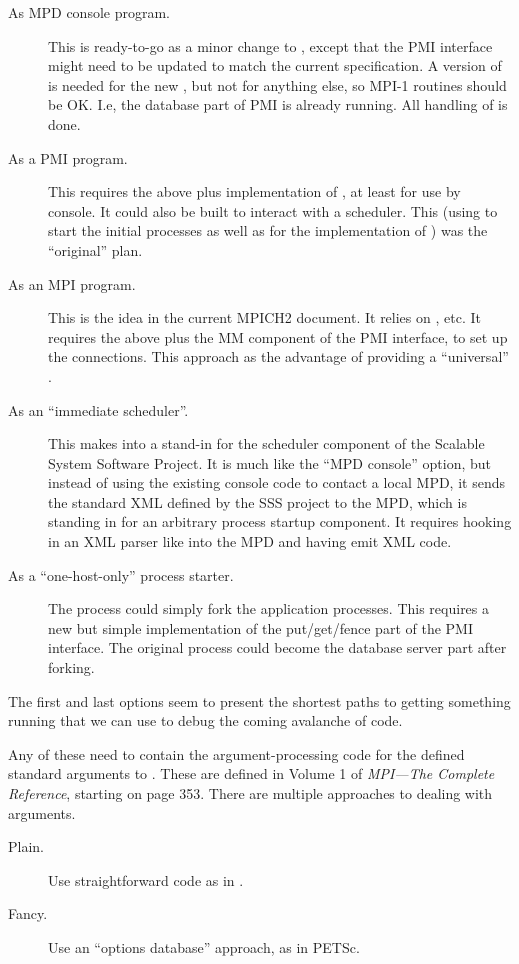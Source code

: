 \documentclass{article}
\let\file=\code
\begin{document}
\begin{description}
\item[As MPD console program.] This is ready-to-go as a minor change to
  \file{mpdcon.c}, except that the PMI interface might need to be updated to
  match 
  the current specification.  A version of  is needed for the
  new 
  , but not for anything else, so MPI-1 routines should be OK.
  I.e, 
  the database part of PMI is already running.  All handling of 
  is done.
\item[As a PMI program.] This requires the above plus implementation of
  , at least for use by console.  It could also be built to
  interact 
  with a scheduler.  This (using  to start the initial
  processes as 
  well as for the implementation of ) was the ``original''
  plan.
\item[As an MPI program.] This is the idea in the current MPICH2 document.  It
  relies on , etc.  It requires the above plus the MM
  component 
  of the PMI interface, to set up the connections.  This approach as the
  advantage of providing a ``universal'' . 
\item[As an ``immediate scheduler''.] This makes  into a stand-in
  for the scheduler component of the Scalable System Software Project.  It is
  much like the ``MPD console'' option, but instead of using the existing
  console code to contact a local MPD, it sends the standard XML defined by
  the SSS project to the MPD, which is standing in for an arbitrary process
  startup component.  It requires hooking in an XML parser like 
  into the MPD and having  emit XML code.
\item[As a ``one-host-only'' process starter.] The  process could
  simply fork the application processes.  This requires a new but simple
  implementation of the put/get/fence part of the PMI interface.  The original
   process could become the database server part after forking.
\end{description}

The first and last options seem to present the shortest paths to getting
something running that we can use to debug the coming avalanche of code.

Any of these need to contain the argument-processing code for the defined
standard arguments to .  These are defined in Volume 1 of \emph{ MPI---The Complete Reference}, starting on page 353.  There are multiple
approaches to dealing with arguments.
\begin{description}
\item[Plain.] Use straightforward code as in \file{p4_args.c}.
\item[Fancy.] Use an ``options database'' approach, as in PETSc.
\end{description}
\end{document}
